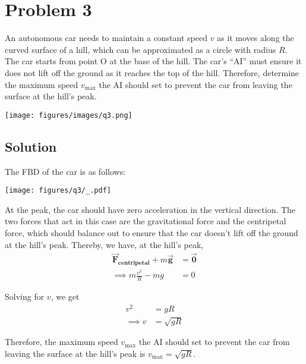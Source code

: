 \section*{Problem 3}

An autonomous car needs to maintain a constant speed \( v \) as it moves along the curved surface of a hill, which can be approximated as a circle with radius \( R \).
The car starts from point O at the base of the hill.
The car's ``AI'' must ensure it does not lift off the ground as it reaches the top of the hill.
Therefore, determine the maximum speed \( v_{\max} \) the AI should set to prevent the car from leaving the surface at the hill's peak.

\begin{figure*}[h]
    \centering
    \texttt{[image: figures/images/q3.png]}
\end{figure*}

\subsection*{Solution}

The FBD of the car is as follows:
\begin{figure*}[h]
    \centering
    \texttt{[image: figures/q3/\_.pdf]}
\end{figure*}

At the peak, the car should have zero acceleration in the vertical direction.
The two forces that act in this case are the gravitational force and the centripetal force, which should balance out to ensure that the car doesn't lift off the ground at the hill's peak.
Thereby, we have, at the hill's peak,
\begin{align*}
    \vec{\mathbf{F}}_{\textbf{centripetal}} + m\vec{\mathbf{g}}
     & =
    \vec{\mathbf{0}} \\
    \implies
    m\frac{v^2}{R} - mg
     & =
    0
\end{align*}

Solving for \( v \), we get
\begin{align*}
    v^2 & = gR        \\
    \implies
    v   & = \sqrt{gR}
\end{align*}

Therefore, the maximum speed \( v_{\max} \) the AI should set to prevent the car from leaving the surface at the hill's peak is \( \boxed{v_{\max} = \sqrt{gR}} \).
